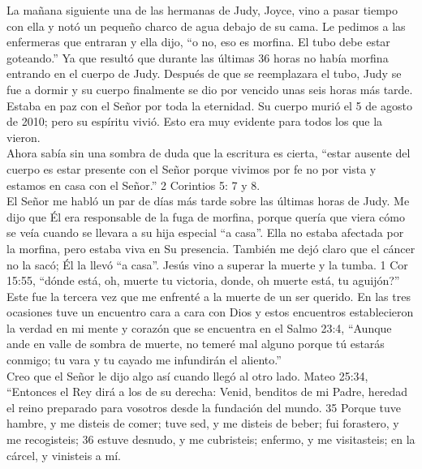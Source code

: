 \documentclass[twoside, 12pt]{book}
\begin{document}
La mañana siguiente una de las hermanas de Judy, Joyce, vino a pasar tiempo con ella y notó un pequeño charco de agua debajo de su cama. Le pedimos a las enfermeras que entraran y ella dijo, “o no, eso es morfina. El tubo debe estar goteando.” Ya que resultó que durante las últimas 36 horas no había morfina entrando en el cuerpo de Judy. Después de que se reemplazara el tubo, Judy se fue a dormir y su cuerpo finalmente se dio por vencido unas seis horas más tarde. Estaba en paz con el Señor por toda la eternidad. Su cuerpo murió el 5 de agosto de 2010; pero su espíritu vivió. Esto era muy evidente para todos los que la vieron.\\
 
Ahora sabía sin una sombra de duda que la escritura es cierta, “estar ausente del cuerpo es estar presente con el Señor porque vivimos por fe no por vista y estamos en casa con el Señor.” 2 Corintios 5: 7 y 8.\\
 
El Señor me habló un par de días más tarde sobre las últimas horas de Judy. Me dijo que Él era responsable de la fuga de morfina, porque quería que viera cómo se veía cuando se llevara a su hija especial “a casa”. Ella no estaba afectada por la morfina, pero estaba viva en Su presencia. También me dejó claro que el cáncer no la sacó; Él la llevó “a casa”. Jesús vino a superar la muerte y la tumba. 1 Cor 15:55, “dónde está, oh, muerte tu victoria, donde, oh muerte está, tu aguijón?”\\
 
Este fue la tercera vez que me enfrenté a la muerte de un ser querido. En las tres ocasiones tuve un encuentro cara a cara con Dios y estos encuentros establecieron la verdad en mi mente y corazón que se encuentra en el Salmo 23:4, “Aunque ande en valle de sombra de muerte, no temeré mal alguno porque tú estarás conmigo; tu vara y tu cayado me infundirán el aliento.”\\
 
Creo que el Señor le dijo algo así cuando llegó al otro lado. Mateo 25:34, “Entonces el Rey dirá a los de su derecha: Venid, benditos de mi Padre, heredad el reino preparado para vosotros desde la fundación del mundo. 35 Porque tuve hambre, y me disteis de comer; tuve sed, y me disteis de beber; fui forastero, y me recogisteis; 36 estuve desnudo, y me cubristeis; enfermo, y me visitasteis; en la cárcel, y vinisteis a mí.\\
 
\end{document}
